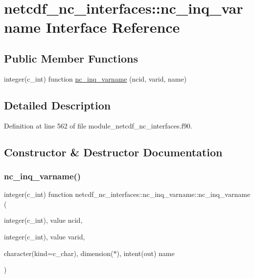 \hypertarget{interfacenetcdf__nc__interfaces_1_1nc__inq__varname}{}\section{netcdf\+\_\+nc\+\_\+interfaces\+:\+:nc\+\_\+inq\+\_\+varname Interface Reference}
\label{interfacenetcdf__nc__interfaces_1_1nc__inq__varname}
\subsection*{Public Member Functions}
\begin{DoxyCompactItemize}
\item 
integer(c\+\_\+int) function \hyperlink{interfacenetcdf__nc__interfaces_1_1nc__inq__varname_a185b5cf2d7bd1121710413b306559f2f}{nc\+\_\+inq\+\_\+varname} (ncid, varid, name)
\end{DoxyCompactItemize}


\subsection{Detailed Description}


Definition at line 562 of file module\+\_\+netcdf\+\_\+nc\+\_\+interfaces.\+f90.



\subsection{Constructor \& Destructor Documentation}
\mbox{\label{interfacenetcdf__nc__interfaces_1_1nc__inq__varname_a185b5cf2d7bd1121710413b306559f2f}} 
\subsubsection{\texorpdfstring{nc\+\_\+inq\+\_\+varname()}{nc\_inq\_varname()}}
{\footnotesize\ttfamily integer(c\+\_\+int) function netcdf\+\_\+nc\+\_\+interfaces\+::nc\+\_\+inq\+\_\+varname\+::nc\+\_\+inq\+\_\+varname (\begin{DoxyParamCaption}\item[{integer(c\+\_\+int), value}]{ncid,  }\item[{integer(c\+\_\+int), value}]{varid,  }\item[{character(kind=c\+\_\+char), dimension($\ast$), intent(out)}]{name }\end{DoxyParamCaption})}



